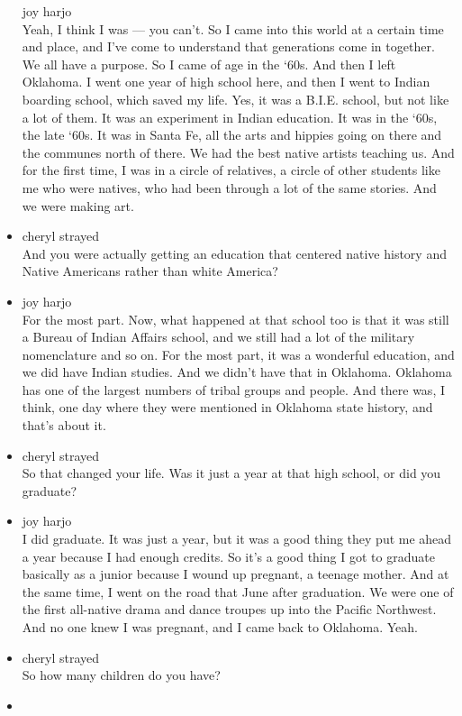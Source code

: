 \begin{itemize}
  joy harjo\\
  Yeah, I think I was --- you can't. So I came into this world at a
  certain time and place, and I've come to understand that generations
  come in together. We all have a purpose. So I came of age in the `60s.
  And then I left Oklahoma. I went one year of high school here, and
  then I went to Indian boarding school, which saved my life. Yes, it
  was a B.I.E. school, but not like a lot of them. It was an experiment
  in Indian education. It was in the `60s, the late `60s. It was in
  Santa Fe, all the arts and hippies going on there and the communes
  north of there. We had the best native artists teaching us. And for
  the first time, I was in a circle of relatives, a circle of other
  students like me who were natives, who had been through a lot of the
  same stories. And we were making art.
\item
  cheryl strayed\\
  And you were actually getting an education that centered native
  history and Native Americans rather than white America?
\item
  joy harjo\\
  For the most part. Now, what happened at that school too is that it
  was still a Bureau of Indian Affairs school, and we still had a lot of
  the military nomenclature and so on. For the most part, it was a
  wonderful education, and we did have Indian studies. And we didn't
  have that in Oklahoma. Oklahoma has one of the largest numbers of
  tribal groups and people. And there was, I think, one day where they
  were mentioned in Oklahoma state history, and that's about it.
\item
  cheryl strayed\\
  So that changed your life. Was it just a year at that high school, or
  did you graduate?
\item
  joy harjo\\
  I did graduate. It was just a year, but it was a good thing they put
  me ahead a year because I had enough credits. So it's a good thing I
  got to graduate basically as a junior because I wound up pregnant, a
  teenage mother. And at the same time, I went on the road that June
  after graduation. We were one of the first all-native drama and dance
  troupes up into the Pacific Northwest. And no one knew I was pregnant,
  and I came back to Oklahoma. Yeah.
\item
  cheryl strayed\\
  So how many children do you have?
\item

\end{itemize}
